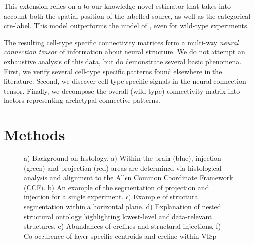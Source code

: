 \documentclass[NETN,manuscript]{stjour-new}
\begin{document}
This extension relies on a to our knowledge novel estimator that takes into account both the spatial position of the labelled source, as well as the categorical cre-label.
This model outperforms the model of \citet{Knox2019-ot}, even for wild-type experiments.

The resulting cell-type specific connectivity matrices form a multi-way \textit{neural connection tensor} of information about neural structure.
We do not attempt an exhaustive analysis of this data, but do demonstrate several basic phenomena.
First, we verify several cell-type specific patterns found elsewhere in the literature.
Second, we discover cell-type specific signals in the neural connection tensor.
Finally, we decompose the overall (wild-type) connectivity matrix into factors representing archetypal connective patterns.



\newpage

\section{Methods}

\begin{figure}[H]
    \newline
    \caption{a) Background on histology. a) Within the brain (blue), injection (green) and projection (red) areas are determined via histological analysis and alignment to the Allen Common Coordinate Framework (CCF). b) An example of the segmentation of projection and injection for a single experiment. \label{fig:1b} c) Example of structural segmentation within a horizontal plane. d) Explanation of nested structural ontology highlighting lowest-level and data-relevant structures. e) Abundances of crelines and structural injections. f) Co-occurence of layer-specific centroids and creline within VISp}
    \label{fig:data}
\end{figure}
\newpage
\end{document}
